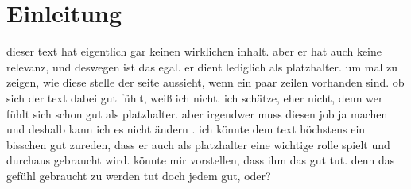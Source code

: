 \chapter{Einleitung}

dieser text hat eigentlich gar keinen wirklichen inhalt. aber er hat auch keine relevanz, und deswegen ist das egal. er dient lediglich als platzhalter. um mal zu zeigen, wie diese stelle der seite aussieht, wenn ein paar zeilen vorhanden sind. ob sich der text dabei gut fühlt, weiß ich nicht. ich schätze, eher nicht, denn wer fühlt sich schon gut als platzhalter. aber irgendwer muss diesen job ja machen und deshalb kann ich es nicht ändern . ich könnte dem text höchstens ein bisschen gut zureden, dass er auch als platzhalter eine wichtige rolle spielt und durchaus gebraucht wird. könnte mir vorstellen, dass ihm das gut tut. denn das gefühl gebraucht zu werden tut doch jedem gut, oder?
